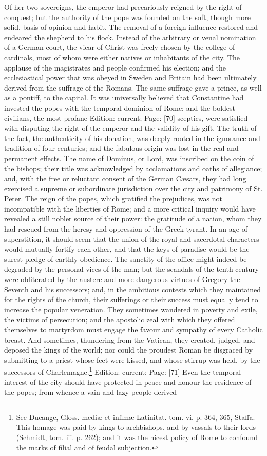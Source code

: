Of her two sovereigns, the emperor had precariously reigned by the right of conquest; but the authority of the pope was founded on the soft, though more solid, basis of opinion and habit. The removal of a foreign influence restored and endeared the shepherd to his flock. Instead of the arbitrary or venal nomination of a German court, the vicar of Christ was freely chosen by the college of cardinals, most of whom were either natives or inhabitants of the city. The applause of the magistrates and people confirmed his election; and the ecclesiastical power that was obeyed in Sweden and Britain had been ultimately derived from the suffrage of the Romans. The same suffrage gave a prince, as well as a pontiff, to the capital. It was universally believed that Constantine had invested the popes with the temporal dominion of Rome; and the boldest civilians, the most profane Edition: current; Page: [70] sceptics, were satisfied with disputing the right of the emperor and the validity of his gift. The truth of the fact, the authenticity of his donation, was deeply rooted in the ignorance and tradition of four centuries; and the fabulous origin was lost in the real and permanent effects. The name of Dominus, or Lord, was inscribed on the coin of the bishops; their title was acknowledged by acclamations and oaths of allegiance; and, with the free or reluctant consent of the German Cæsars, they had long exercised a supreme or subordinate jurisdiction over the city and patrimony of St. Peter. The reign of the popes, which gratified the prejudices, was not incompatible with the liberties of Rome; and a more critical inquiry would have revealed a still nobler source of their power: the gratitude of a nation, whom they had rescued from the heresy and oppression of the Greek tyrant. In an age of superstition, it should seem that the union of the royal and sacerdotal characters would mutually fortify each other, and that the keys of paradise would be the surest pledge of earthly obedience. The sanctity of the office might indeed be degraded by the personal vices of the man; but the scandals of the tenth century were obliterated by the austere and more dangerous virtues of Gregory the Seventh and his successors; and, in the ambitious contests which they maintained for the rights of the church, their sufferings or their success must equally tend to increase the popular veneration. They sometimes wandered in poverty and exile, the victims of persecution; and the apostolic zeal with which they offered themselves to martyrdom must engage the favour and sympathy of every Catholic breast. And sometimes, thundering from the Vatican, they created, judged, and deposed the kings of the world; nor could the proudest Roman be disgraced by submitting to a priest whose feet were kissed, and whose stirrup was held, by the successors of Charlemagne.\footnote{See Ducange, Gloss. mediæ et infimæ Latinitat. tom. vi. p. 364, 365, Staffa. This homage was paid by kings to archbishops, and by vassals to their lords (Schmidt, tom. iii. p. 262); and it was the nicest policy of Rome to confound the marks of filial and of feudal subjection.} Edition: current; Page: [71] Even the temporal interest of the city should have protected in peace and honour the residence of the popes; from whence a vain and lazy people derived 